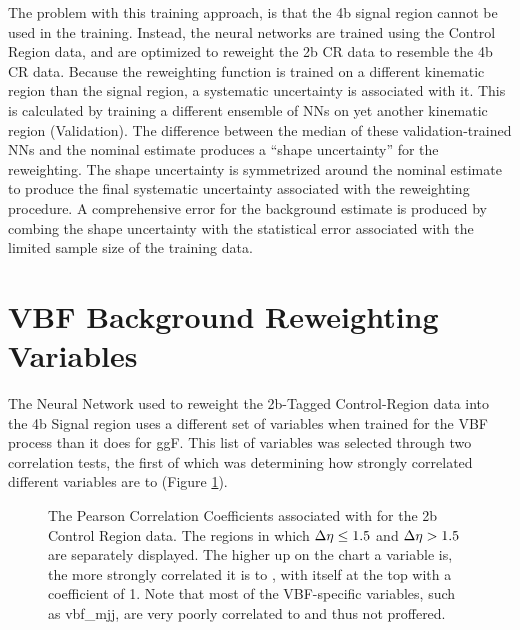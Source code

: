     The problem with this training approach, is that the 4b signal region cannot be used in the training.
    Instead, the neural networks are trained using the Control Region data,
        and are optimized to reweight the 2b CR data to resemble the 4b CR data.
    Because the reweighting function is trained on a different kinematic region than the signal region,
        a systematic uncertainty is associated with it.
    This is calculated by training a different ensemble of NNs on yet another kinematic region (Validation).
    The difference between the median of these validation-trained NNs and the nominal estimate
        produces a ``shape uncertainty'' for the reweighting.
    The shape uncertainty is symmetrized around the nominal estimate to produce the final systematic uncertainty
        associated with the reweighting procedure.
    A comprehensive error for the background estimate is produced by combing the shape uncertainty with the statistical error
        associated with the limited sample size of the training data.


\section{VBF Background Reweighting Variables} \label{sec:vbf_bgdNNRW}

    The Neural Network used to reweight the 2b-Tagged Control-Region data into the 4b Signal region
        uses a different set of variables when trained for the VBF process than it does for ggF.
    This list of variables was selected through two correlation tests,
        the first of which was determining how strongly correlated different variables are to \mhh
        (Figure \ref{fig:mhh_corr}).

    \begin{figure}[!htbp]
        \caption{
            The Pearson Correlation Coefficients associated with \mhh for the 2b Control Region data.
            The regions in which $\Delta \eta \leq 1.5$ and $\Delta \eta>1.5$ are separately displayed.
            The higher up on the chart a variable is, the more strongly correlated it is to \mhh,
                with \mhh itself at the top with a coefficient of 1.
            Note that most of the VBF-specific variables, such as vbf\_mjj, are very poorly correlated to \mhh and thus not proffered.
        }
        \label{fig:mhh_corr}
    \end{figure}

